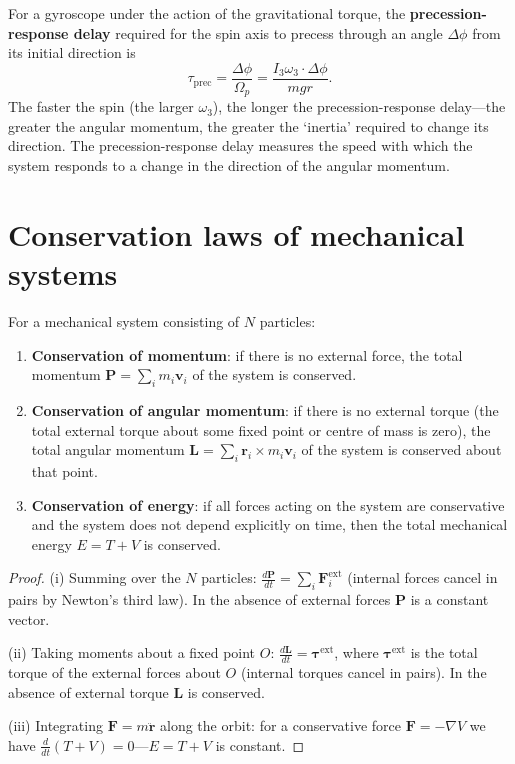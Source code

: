 \begin{definition}\label{def:gyroscope_precession_delay}
For a gyroscope under the action of the gravitational torque, the \textbf{precession-response delay} required for the spin axis to precess through an angle $\Delta\phi$ from its initial direction is
\[
\tau_{\text{prec}} = \frac{\Delta\phi}{\Omega_p} = \frac{I_3\omega_3 \cdot \Delta\phi}{mgr}.
\]
The faster the spin (the larger $\omega_3$), the longer the precession-response delay---the greater the angular momentum, the greater the `inertia' required to change its direction. The precession-response delay measures the speed with which the system responds to a change in the direction of the angular momentum.
\end{definition}

\section{Conservation laws of mechanical systems}

\begin{theorem}\label{thm:mechanical_conservation}
For a mechanical system consisting of $N$ particles:
\begin{enumerate}[label=(\roman*)]
    \item \textbf{Conservation of momentum}: if there is no external force, the total momentum $\mathbf{P} = \sum_i m_i\mathbf{v}_i$ of the system is conserved.
    \item \textbf{Conservation of angular momentum}: if there is no external torque (the total external torque about some fixed point or centre of mass is zero), the total angular momentum $\mathbf{L} = \sum_i \mathbf{r}_i\times m_i\mathbf{v}_i$ of the system is conserved about that point.
    \item \textbf{Conservation of energy}: if all forces acting on the system are conservative and the system does not depend explicitly on time, then the total mechanical energy $E = T + V$ is conserved.
\end{enumerate}
\end{theorem}

\begin{proof}
(i) Summing over the $N$ particles: $\frac{d\mathbf{P}}{dt} = \sum_i \mathbf{F}_i^{\text{ext}}$ (internal forces cancel in pairs by Newton's third law). In the absence of external forces $\mathbf{P}$ is a constant vector.

(ii) Taking moments about a fixed point $O$: $\frac{d\mathbf{L}}{dt} = \boldsymbol{\tau}^{\text{ext}}$, where $\boldsymbol{\tau}^{\text{ext}}$ is the total torque of the external forces about $O$ (internal torques cancel in pairs). In the absence of external torque $\mathbf{L}$ is conserved.

(iii) Integrating $\mathbf{F} = m\ddot{\mathbf{r}}$ along the orbit: for a conservative force $\mathbf{F} = -\nabla V$ we have $\frac{d}{dt}(T+V) = 0$---$E = T + V$ is constant.
\end{proof}


